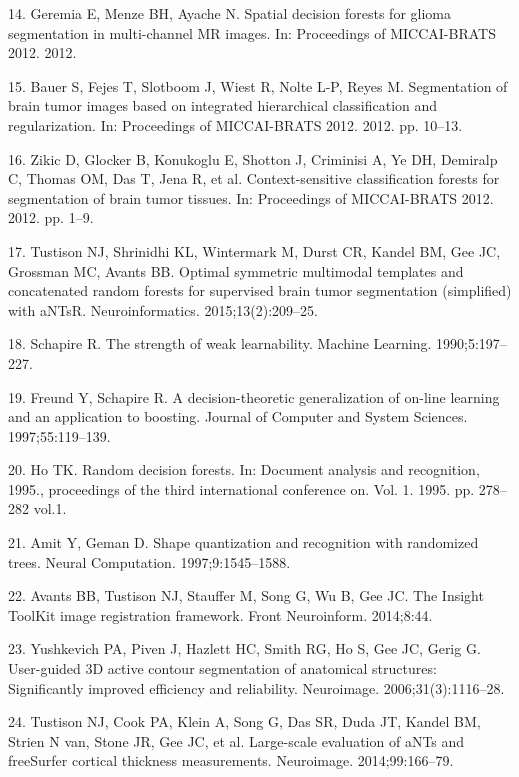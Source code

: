 \documentclass[11pt,]{article}
\begin{document}
\hypertarget{ref-geremia2012}{}
14. Geremia E, Menze BH, Ayache N. Spatial decision forests for glioma
segmentation in multi-channel MR images. In: Proceedings of MICCAI-BRATS
2012. 2012.

\hypertarget{ref-bauer2012}{}
15. Bauer S, Fejes T, Slotboom J, Wiest R, Nolte L-P, Reyes M.
Segmentation of brain tumor images based on integrated hierarchical
classification and regularization. In: Proceedings of MICCAI-BRATS 2012.
2012. pp. 10--13.

\hypertarget{ref-zikic2012}{}
16. Zikic D, Glocker B, Konukoglu E, Shotton J, Criminisi A, Ye DH,
Demiralp C, Thomas OM, Das T, Jena R, et al. Context-sensitive
classification forests for segmentation of brain tumor tissues. In:
Proceedings of MICCAI-BRATS 2012. 2012. pp. 1--9.

\hypertarget{ref-Tustison:2015aa}{}
17. Tustison NJ, Shrinidhi KL, Wintermark M, Durst CR, Kandel BM, Gee
JC, Grossman MC, Avants BB. Optimal symmetric multimodal templates and
concatenated random forests for supervised brain tumor segmentation
(simplified) with aNTsR. Neuroinformatics. 2015;13(2):209--25.

\hypertarget{ref-schapire1990}{}
18. Schapire R. The strength of weak learnability. Machine Learning.
1990;5:197--227.

\hypertarget{ref-freund1997}{}
19. Freund Y, Schapire R. A decision-theoretic generalization of on-line
learning and an application to boosting. Journal of Computer and System
Sciences. 1997;55:119--139.

\hypertarget{ref-ho1995}{}
20. Ho TK. Random decision forests. In: Document analysis and
recognition, 1995., proceedings of the third international conference
on. Vol. 1. 1995. pp. 278--282 vol.1.

\hypertarget{ref-amit1997}{}
21. Amit Y, Geman D. Shape quantization and recognition with randomized
trees. Neural Computation. 1997;9:1545--1588.

\hypertarget{ref-Avants:2014aa}{}
22. Avants BB, Tustison NJ, Stauffer M, Song G, Wu B, Gee JC. The
Insight ToolKit image registration framework. Front Neuroinform.
2014;8:44.

\hypertarget{ref-Yushkevich:2006aa}{}
23. Yushkevich PA, Piven J, Hazlett HC, Smith RG, Ho S, Gee JC, Gerig G.
User-guided 3D active contour segmentation of anatomical structures:
Significantly improved efficiency and reliability. Neuroimage.
2006;31(3):1116--28.

\hypertarget{ref-Tustison:2014ab}{}
24. Tustison NJ, Cook PA, Klein A, Song G, Das SR, Duda JT, Kandel BM,
Strien N van, Stone JR, Gee JC, et al. Large-scale evaluation of aNTs
and freeSurfer cortical thickness measurements. Neuroimage.
2014;99:166--79.
\end{document}
